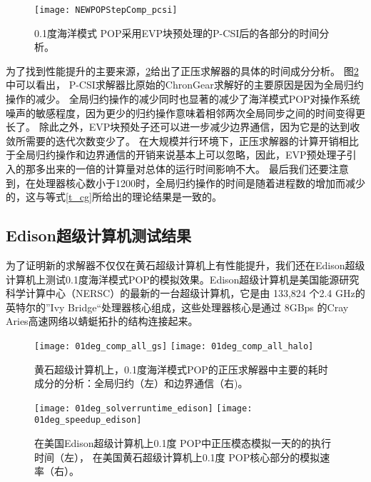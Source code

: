 \begin {figure}
\centering
\texttt{[image: NEWPOPStepComp\_pcsi]}
\caption[] { 0.1度海洋模式 POP采用EVP块预处理的P-CSI后的各部分的时间分析。 \label{fig:StepComp_pcsi}}
\end{figure}



为了找到性能提升的主要来源，\ref{fig:component}给出了正压求解器的具体的时间成分分析。 
图\ref{fig:component}中可以看出， P-CSI求解器比原始的ChronGear求解好的主要原因是因为全局归约操作的减少。 
全局归约操作的减少同时也显著的减少了海洋模式POP对操作系统噪声的敏感程度\cite{ferreira}，因为更少的归约操作意味着相邻两次全局同步之间的时间变得更长了。 
除此之外，EVP块预处子还可以进一步减少边界通信，因为它是的达到收敛所需要的迭代次数变少了。 
在大规模并行环境下，正压求解器的计算开销相比于全局归约操作和边界通信的开销来说基本上可以忽略，因此，EVP预处理子引入的那多出来的一倍的计算量对总体的运行时间影响不大。
最后我们还要注意到，在处理器核心数小于1200时，全局归约操作的时间是随着进程数的增加而减少的，这与等式\ref{t_cg}所给出的理论结果是一致的。

 

\subsection{Edison超级计算机测试结果}
\label{precond:exp:Edison}

 
为了证明新的求解器不仅仅在黄石超级计算机上有性能提升，我们还在Edison超级计算机上测试0.1度海洋模式POP的模拟效果。Edison超级计算机是美国能源研究科学计算中心（NERSC）的最新的一台超级计算机，它是由 133,824 个2.4 GHz的英特尔的”Ivy Bridge“处理器核心组成，这些处理器核心是通过 8GBps 的Cray
Aries高速网络以蜻蜓拓扑的结构连接起来。  
\begin {figure} 
\begin{center}
\texttt{[image: 01deg\_comp\_all\_gs]}
\hspace{10pt}
\texttt{[image: 01deg\_comp\_all\_halo]}
\end{center}
\caption[] {黄石超级计算机上，0.1度海洋模式POP的正压求解器中主要的耗时成分的分析：全局归约（左）和边界通信（右)。}
\label{fig:component}
\end {figure}
\begin {figure}
\begin{center}
\texttt{[image: 01deg\_solverruntime\_edison]}
\hspace{10pt}
\texttt{[image: 01deg\_speedup\_edison]}
\end{center}
 
\caption []{在美国Edison超级计算机上0.1度 POP中正压模态模拟一天的的执行时间（左）， 
在美国黄石超级计算机上0.1度 POP核心部分的模拟速率（右）。\label {fig:runtime01_edison}}
 
\end {figure}

